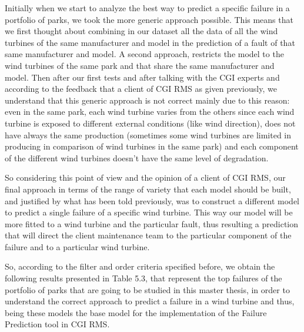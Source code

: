 Initially when we start to analyze the best way to predict a specific failure in a portfolio of parks, we took the more generic approach possible. This means that we first thought about combining in our dataset all the data of all the wind turbines of the same manufacturer and model in the prediction of a fault of that same manufacturer and model. A second approach, restricts the model to the wind turbines of the same park and that share the same manufacturer and model. Then after our first tests and after talking with the CGI experts and according to the feedback that a client of CGI RMS as given previously, we understand that this generic approach is not correct mainly due to this reason: even in the same park, each wind turbine varies from the others since each wind turbine is exposed to different external conditions (like wind direction), does not have always the same production (sometimes some wind turbines are limited in producing in comparison of wind turbines in the same park) and each component of the different wind turbines doesn't have the same level of degradation. 


So considering this point of view and the opinion of a client of CGI RMS, our final approach in terms of the range of variety that each model should be built, and justified by what has been told previously, was to construct a different model to predict a single failure of a specific wind turbine. This way our model will be more fitted to a wind turbine and the particular fault, thus resulting a prediction that will direct the client maintenance team to the particular component of the failure and to a particular wind turbine.

So, according to the filter and order criteria specified before, we obtain the following results presented in Table 5.3, that represent the top failures of the portfolio of parks that are going to be studied in this master thesis, in order to understand the correct approach to predict a failure in a wind turbine and thus, being these models the base model for the implementation of the Failure Prediction tool in CGI RMS.

